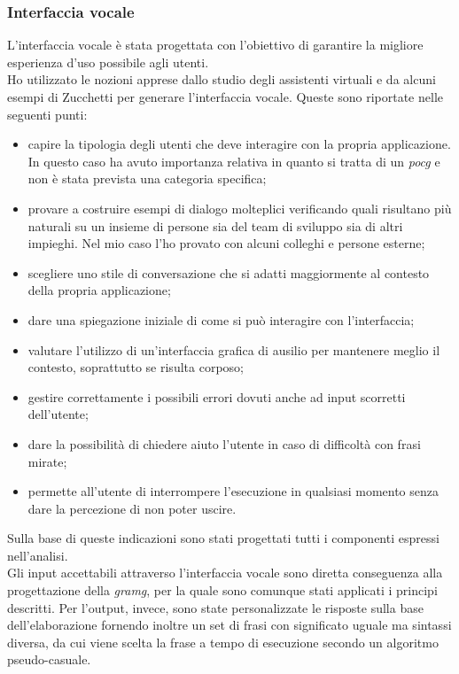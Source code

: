 		\subsubsection{Interfaccia vocale}
		L'interfaccia vocale è stata progettata con l'obiettivo di garantire la migliore esperienza d'uso possibile agli utenti. \\
		Ho utilizzato le nozioni apprese dallo studio degli assistenti virtuali e da alcuni esempi di Zucchetti per generare l'interfaccia vocale. Queste sono riportate nelle seguenti punti:
		\begin{itemize}
			\item capire la tipologia degli utenti che deve interagire con la propria applicazione. In questo caso ha avuto importanza relativa in quanto si tratta di un \emph{\gls{pocg}} e non è stata prevista una categoria specifica;
			\item provare a costruire esempi di dialogo molteplici verificando quali risultano più naturali su un insieme di persone sia del team di sviluppo sia di altri impieghi. Nel mio caso l'ho provato con alcuni colleghi e persone esterne;
			\item scegliere uno stile di conversazione che si adatti maggiormente al contesto della propria applicazione;
			\item dare una spiegazione iniziale di come si può interagire con l'interfaccia;
			\item valutare l'utilizzo di un'interfaccia grafica di ausilio per mantenere meglio il contesto, soprattutto se risulta corposo;
			\item gestire correttamente i possibili errori dovuti anche ad input scorretti dell'utente;
			\item dare la possibilità di chiedere aiuto l'utente in caso di difficoltà con frasi mirate;
			\item permette all'utente di interrompere l'esecuzione in qualsiasi momento senza dare la percezione di non poter uscire.
		\end{itemize}		
		Sulla base di queste indicazioni sono stati progettati tutti i componenti espressi nell'analisi. \\
		Gli input accettabili attraverso l'interfaccia vocale sono diretta conseguenza alla progettazione della \emph{\gls{gramg}}, per la quale sono comunque stati applicati i principi descritti. Per l'output, invece, sono state personalizzate le risposte sulla base dell'elaborazione fornendo inoltre un set di frasi con significato uguale ma sintassi diversa, da cui viene scelta la frase a tempo di esecuzione secondo un algoritmo pseudo-casuale.
